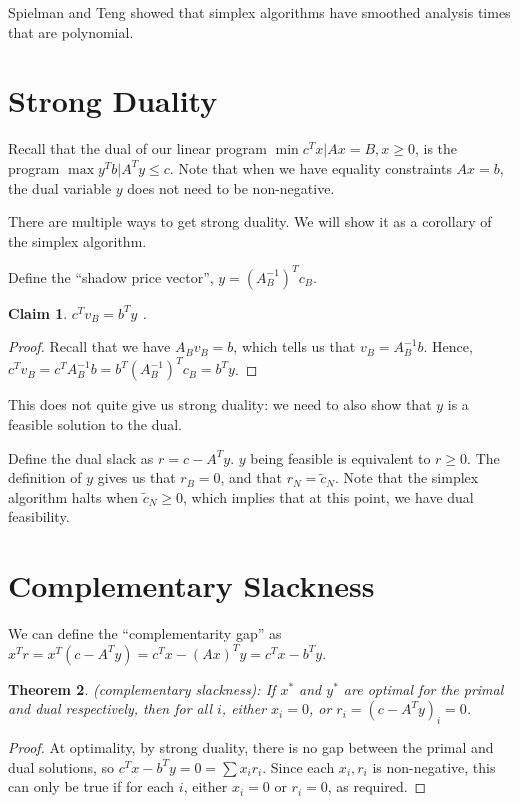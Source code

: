\documentclass[11pt]{article}
\newtheorem{theorem}{Theorem}
\newtheorem{claim}[theorem]{Claim}
\begin{document}
Spielman and Teng showed that simplex algorithms have smoothed analysis
times that are polynomial.


\section{Strong Duality}

Recall that the dual of our linear program $\min c^{T}x|Ax=B,x\geq0$,
is the program $\max y^{T}b|A^{T}y\leq c$. Note that when we have
equality constraints $Ax=b$, the dual variable $y$ does not need
to be non-negative.

There are multiple ways to get strong duality. We will show it as
a corollary of the simplex algorithm.

Define the ``shadow price vector'', $y=(A_{B}^{-1})^{T}c_{B}$.

\begin{claim}
  $c^{T}v_{B}=b^{T}y$ .
\end{claim}

\begin{proof}
  Recall that we have $A_{B}v_{B}=b$, which tells us that $v_{B}=A_{B}^{-1}b$.
  Hence, $c^{T}v_{B}=c^{T}A_{B}^{-1}b=b^{T}(A_{B}^{-1})^{T}c_{B}=b^{T}y$.
\end{proof}

This does not quite give us strong duality: we need to also show that
$y$ is a feasible solution to the dual.

Define the dual slack as $r=c-A^{T}y$. $y$ being feasible is equivalent
to $r\geq0$. The definition of $y$ gives us that $r_{B}=0$, and
that $r_{N}=\tilde{c}_{N}$. Note that the simplex algorithm halts
when $\tilde{c}_{N}\geq0$, which implies that at this point, we have
dual feasibility.


\section{Complementary Slackness}

We can define the ``complementarity gap'' as $x^{T}r=x^{T}(c-A^{T}y)=c^{T}x-(Ax)^{T}y=c^{T}x-b^{T}y$.


\begin{theorem}
  (complementary slackness): If $x^{*}$ and $y^{*}$ are optimal
  for the primal and dual respectively, then for all $i$, either $x_{i}=0$,
  or $r_{i}=(c-A^{T}y)_{i}=0$.
\end{theorem}

\begin{proof}
  At optimality, by strong duality, there is no gap between the
  primal and dual solutions, so $c^{T}x-b^{T}y=0=\sum x_{i}r_{i}$.
  Since each $x_{i},r_{i}$ is non-negative, this can only be true if
  for each $i$, either $x_{i}=0$ or $r_{i}=0$, as required.
\end{proof}
\end{document}

